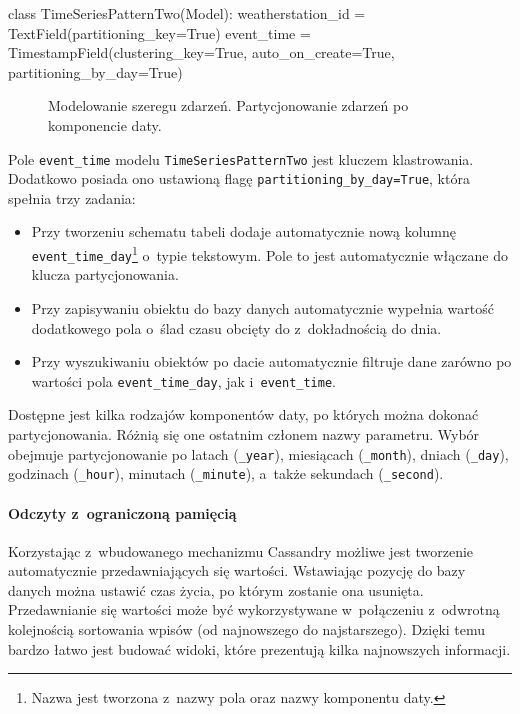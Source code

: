 \begin{verbbox}[\footnotesize]
class TimeSeriesPatternTwo(Model):
    weatherstation_id = TextField(partitioning_key=True)
    event_time = TimestampField(clustering_key=True, 
                                auto_on_create=True, 
                                partitioning_by_day=True)
\end{verbbox}

\begin{figure}[ht!]
	\centering
	\theverbbox
	\caption{Modelowanie szeregu zdarzeń. Partycjonowanie zdarzeń po komponencie daty.}
	\label{lst:time_series_modeling_two}
\end{figure}

Pole \verb+event_time+ modelu \verb+TimeSeriesPatternTwo+ jest kluczem klastrowania. Dodatkowo posiada ono ustawioną flagę \verb+partitioning_by_day=True+, która spełnia trzy zadania:

\begin{itemize}
	\item Przy tworzeniu schematu tabeli dodaje automatycznie nową kolumnę \verb+event_time_day+\footnote{Nazwa jest tworzona z~nazwy pola oraz nazwy komponentu daty.} o~typie tekstowym. Pole to jest automatycznie włączane do klucza partycjonowania.
	\item Przy zapisywaniu obiektu do bazy danych automatycznie wypełnia wartość dodatkowego pola o~ślad czasu obcięty do z~dokładnością do dnia.
	\item Przy wyszukiwaniu obiektów po dacie automatycznie filtruje dane zarówno po wartości pola \verb+event_time_day+, jak i~\verb+event_time+.
\end{itemize}

Dostępne jest kilka rodzajów komponentów daty, po których można dokonać partycjonowania. Różnią się one ostatnim członem nazwy parametru. Wybór obejmuje partycjonowanie po latach (\verb+_year+), miesiącach (\verb+_month+), dniach (\verb+_day+), godzinach (\verb+_hour+), minutach (\verb+_minute+), a~także sekundach (\verb+_second+).

\paragraph{Odczyty z~ograniczoną pamięcią}

Korzystając z~wbudowanego mechanizmu Cassandry możliwe jest tworzenie automatycznie przedawniających się wartości. Wstawiając pozycję do bazy danych można ustawić czas życia, po którym zostanie ona usunięta. Przedawnianie się wartości może być wykorzystywane w~połączeniu z~odwrotną kolejnością sortowania wpisów (od najnowszego do najstarszego). Dzięki temu bardzo łatwo jest budować widoki, które prezentują kilka najnowszych informacji.

